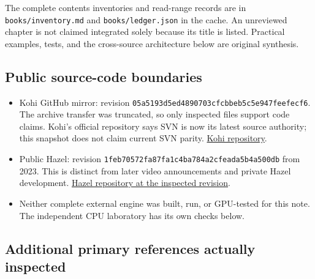 The complete contents inventories and read-range records are in \texttt{books/inventory.md} and \texttt{books/ledger.json} in the cache. An unreviewed chapter is not claimed integrated solely because its title is listed. Practical examples, tests, and the cross-source architecture below are original synthesis.

\subsection{Public source-code boundaries}\label{appendix-877738f6f4d2-public-source-code-boundaries}

\begin{itemize}
\tightlist
\item
  Kohi GitHub mirror: revision \texttt{05a5193d5ed4890703cfcbbeb5c5e947feefecf6}. The archive transfer was truncated, so only inspected files support code claims. Kohi's official repository says SVN is now its latest source authority; this snapshot does not claim current SVN parity. \href{https://github.com/travisvroman/kohi}{Kohi repository}.
\item
  Public Hazel: revision \texttt{1feb70572fa87fa1c4ba784a2cfeada5b4a500db} from 2023. This is distinct from later video announcements and private Hazel development. \href{https://github.com/TheCherno/Hazel/tree/1feb70572fa87fa1c4ba784a2cfeada5b4a500db}{Hazel repository at the inspected revision}.
\item
  Neither complete external engine was built, run, or GPU-tested for this note. The independent CPU laboratory has its own checks below.
\end{itemize}

\subsection{Additional primary references actually inspected}\label{appendix-877738f6f4d2-additional-primary-references-actually-inspected}

